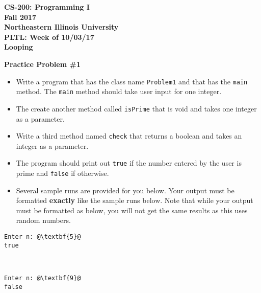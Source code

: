 \documentclass[12pt]{article}
\begin{document}
\begin{center}
	\textbf{CS-200: Programming I}\\
	\textbf{Fall 2017}\\
	\textbf{Northeastern Illinois University}\\
	\textbf{PLTL: Week of 10/03/17}\\
	\textbf{Looping}
\end{center}


\noindent\textbf{Practice Problem \#1}
\begin{itemize}
	\item Write a program that has the class name \texttt{Problem1} and that has the \texttt{main} method. The \texttt{main} method should take user input for one integer.
	\item The create another method called \texttt{isPrime} that is void and takes one integer as a parameter. 
	\item Write a third method named \texttt{check} that returns a boolean and takes an integer as a parameter.
	\item The program should print out \texttt{true} if the number entered by the user is prime and \texttt{false} if otherwise.
	\item Several sample runs are provided for you below. Your output must be formatted \textbf{exactly} like the sample runs below. Note that while your output must be formatted as below, you will not get the same results as this uses random numbers.
\end{itemize}
\begin{center}
\begin{minipage}{8cm}
\begin{lstlisting}[escapechar=@]
Enter n: @\textbf{5}@
true
\end{lstlisting}
\end{minipage}\\
\vspace*{0.5cm}
\begin{minipage}{8cm}
\begin{lstlisting}[escapechar=@]
Enter n: @\textbf{9}@
false
\end{lstlisting}
\end{minipage}
\end{center}
\end{document}
